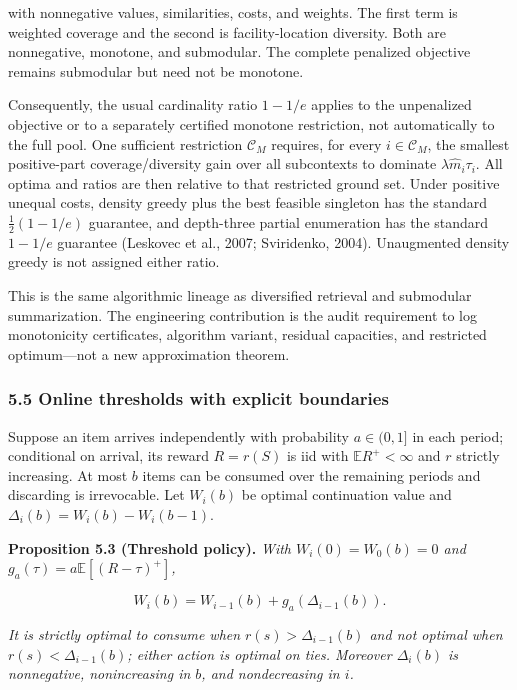 \documentclass[
  11pt]{article}
\begin{document}
with nonnegative values, similarities, costs, and weights. The first
term is weighted coverage and the second is facility-location diversity.
Both are nonnegative, monotone, and submodular. The complete penalized
objective remains submodular but need not be monotone.

Consequently, the usual cardinality ratio \(1-1/e\) applies to the
unpenalized objective or to a separately certified monotone restriction,
not automatically to the full pool. One sufficient restriction
\(\mathcal C_M\) requires, for every \(i\in\mathcal C_M\), the smallest
positive-part coverage/diversity gain over all subcontexts to dominate
\(\lambda\hat m_i\tau_i\). All optima and ratios are then relative to
that restricted ground set. Under positive unequal costs, density greedy
plus the best feasible singleton has the standard \(\tfrac12(1-1/e)\)
guarantee, and depth-three partial enumeration has the standard
\(1-1/e\) guarantee (Leskovec et al., 2007; Sviridenko, 2004).
Unaugmented density greedy is not assigned either ratio.

This is the same algorithmic lineage as diversified retrieval and
submodular summarization. The engineering contribution is the audit
requirement to log monotonicity certificates, algorithm variant,
residual capacities, and restricted optimum---not a new approximation
theorem.

\subsubsection{5.5 Online thresholds with explicit
boundaries}\label{online-thresholds-with-explicit-boundaries}

Suppose an item arrives independently with probability \(a\in(0,1]\) in
each period; conditional on arrival, its reward \(R=r(S)\) is iid with
\(\mathbb E R^+<\infty\) and \(r\) strictly increasing. At most \(b\)
items can be consumed over the remaining periods and discarding is
irrevocable. Let \(W_i(b)\) be optimal continuation value and
\(\Delta_i(b)=W_i(b)-W_i(b-1)\).

\textbf{Proposition 5.3 (Threshold policy).} \emph{With
\(W_i(0)=W_0(b)=0\) and \(g_a(\tau)=a\mathbb E[(R-\tau)^+]\),}

\[W_i(b)=W_{i-1}(b)+g_a(\Delta_{i-1}(b)).\]

\emph{It is strictly optimal to consume when \(r(s)>\Delta_{i-1}(b)\)
and not optimal when \(r(s)<\Delta_{i-1}(b)\); either action is optimal
on ties. Moreover \(\Delta_i(b)\) is nonnegative, nonincreasing in
\(b\), and nondecreasing in \(i\).}
\end{document}
